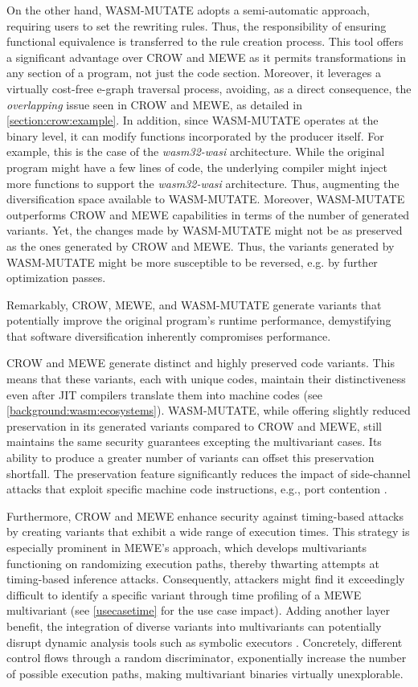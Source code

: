 On the other hand, WASM-MUTATE adopts a semi-automatic approach, requiring users to set the rewriting rules. Thus, the responsibility of ensuring functional equivalence is transferred to the rule creation process.
This tool offers a significant advantage over CROW and MEWE as it permits transformations in any section of a \wasm program, not just the code section.
Moreover, it leverages a virtually cost-free e-graph traversal process, avoiding, as a direct consequence, the \emph{overlapping} issue seen in CROW and MEWE, as detailed in \autoref{section:crow:example}. 
In addition, since WASM-MUTATE operates at the binary level, it can modify functions incorporated by the \Wasm producer itself.
For example, this is the case of the \emph{wasm32-wasi} architecture.
While the original program might have a few lines of code, the underlying compiler might inject more functions to support the \emph{wasm32-wasi} architecture.
Thus, augmenting the diversification space available to WASM-MUTATE.
Moreover, WASM-MUTATE outperforms CROW and MEWE capabilities in terms of the number of generated variants.
Yet, the changes made by WASM-MUTATE might not be as preserved as the ones generated by CROW and MEWE.
Thus, the variants generated by WASM-MUTATE might be more susceptible to be reversed, e.g. by further optimization passes.

Remarkably, CROW, MEWE, and WASM-MUTATE generate variants that potentially improve the original program's runtime performance, demystifying that software diversification inherently compromises performance.

CROW and MEWE generate distinct and highly preserved code variants. 
This means that these variants, each with unique \Wasm codes, maintain their distinctiveness even after JIT compilers translate them into machine codes (see \autoref{background:wasm:ecosystems}). 
WASM-MUTATE, while offering slightly reduced preservation in its generated variants compared to CROW and MEWE, still maintains the same security guarantees excepting the multivariant cases.
Its ability to produce a greater number of variants can offset this preservation shortfall.
The preservation feature significantly reduces the impact of side-channel attacks that exploit specific machine code instructions, e.g., port contention \cite{10.1145/3488932.3517411}.


Furthermore, CROW and MEWE enhance security against timing-based attacks by creating variants that exhibit a wide range of execution times. 
This strategy is especially prominent in MEWE’s approach, which develops multivariants functioning on randomizing execution paths, thereby thwarting attempts at timing-based inference attacks. 
Consequently, attackers might find it exceedingly difficult to identify a specific variant through time profiling of a MEWE multivariant (see \autoref{usecasetime} for the use case impact).
Adding another layer benefit, the integration of diverse variants into multivariants can potentially disrupt dynamic analysis tools such as symbolic executors \cite{wasmixer}. 
Concretely, different control flows through a random discriminator, exponentially increase the number of possible execution paths, making multivariant binaries virtually unexplorable.



